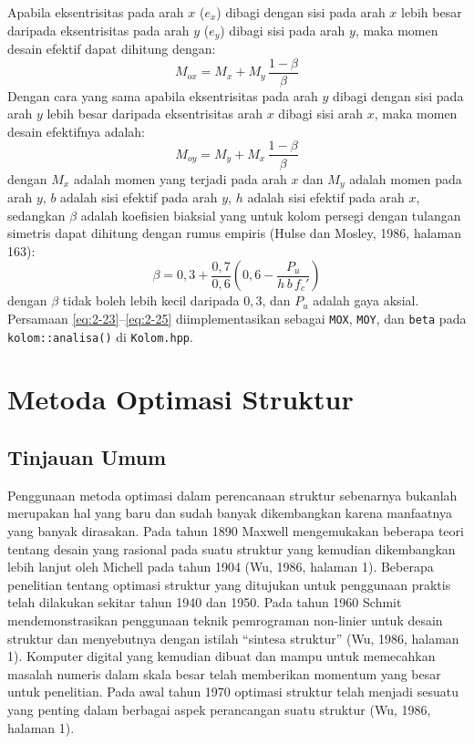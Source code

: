 Apabila eksentrisitas pada arah $x$ ($e_x$) dibagi dengan sisi pada arah
$x$ lebih besar daripada eksentrisitas pada arah $y$ ($e_y$) dibagi sisi
pada arah $y$, maka momen desain efektif dapat dihitung dengan:
\begin{equation}
M_{ox} = M_x + M_y\,\frac{1-\beta}{\beta}
\label{eq:2-23}
\end{equation}
Dengan cara yang sama apabila eksentrisitas pada arah $y$ dibagi dengan
sisi pada arah $y$ lebih besar daripada eksentrisitas arah $x$ dibagi sisi
arah $x$, maka momen desain efektifnya adalah:
\begin{equation}
M_{oy} = M_y + M_x\,\frac{1-\beta}{\beta}
\label{eq:2-24}
\end{equation}
dengan $M_x$ adalah momen yang terjadi pada arah $x$ dan $M_y$ adalah
momen pada arah $y$, $b$ adalah sisi efektif pada arah $y$, $h$ adalah
sisi efektif pada arah $x$, sedangkan $\beta$ adalah koefisien biaksial
yang untuk kolom persegi dengan tulangan simetris dapat dihitung dengan
rumus empiris (Hulse dan Mosley, 1986, halaman 163):
\begin{equation}
\beta = 0{,}3 + \frac{0{,}7}{0{,}6}\left(0{,}6 - \frac{P_u}{h\,b\,f_c'}\right)
\label{eq:2-25}
\end{equation}
dengan $\beta$ tidak boleh lebih kecil daripada $0{,}3$, dan $P_u$ adalah
gaya aksial. Persamaan \eqref{eq:2-23}--\eqref{eq:2-25} diimplementasikan
sebagai \texttt{MOX}, \texttt{MOY}, dan \texttt{beta} pada
\texttt{kolom::analisa()} di \texttt{Kolom.hpp}.

\section{Metoda Optimasi Struktur}

\subsection{Tinjauan Umum}

Penggunaan metoda optimasi dalam perencanaan struktur sebenarnya bukanlah
merupakan hal yang baru dan sudah banyak dikembangkan karena manfaatnya
yang banyak dirasakan. Pada tahun 1890 Maxwell mengemukakan beberapa teori
tentang desain yang rasional pada suatu struktur yang kemudian dikembangkan
lebih lanjut oleh Michell pada tahun 1904 (Wu, 1986, halaman 1). Beberapa
penelitian tentang optimasi struktur yang ditujukan untuk penggunaan
praktis telah dilakukan sekitar tahun 1940 dan 1950. Pada tahun 1960
Schmit mendemonstrasikan penggunaan teknik pemrograman non-linier untuk
desain struktur dan menyebutnya dengan istilah ``sintesa struktur'' (Wu,
1986, halaman 1). Komputer digital yang kemudian dibuat dan mampu untuk
memecahkan masalah numeris dalam skala besar telah memberikan momentum
yang besar untuk penelitian. Pada awal tahun 1970 optimasi struktur telah
menjadi sesuatu yang penting dalam berbagai aspek perancangan suatu
struktur (Wu, 1986, halaman 1).

